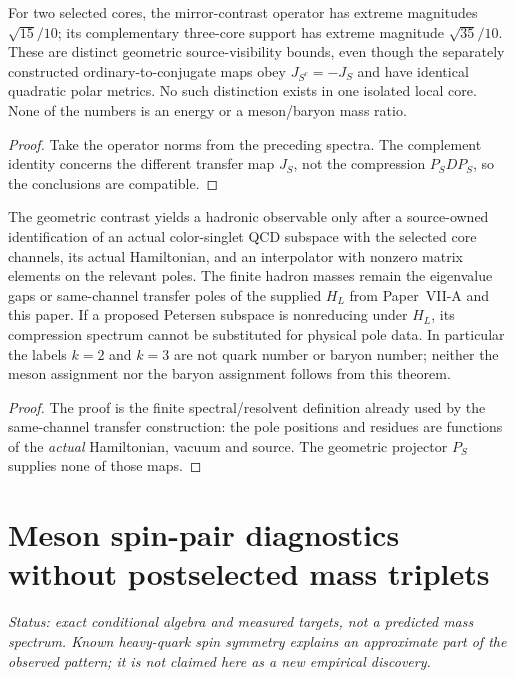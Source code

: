 \documentclass[12pt,a4paper]{article}
\begin{document}
\begin{corollary}
\label{p11:cor:v323-2-3-contrast}
For two selected cores, the mirror-contrast operator has extreme
magnitudes $\sqrt{15}/10$; its complementary three-core support has
extreme magnitude $\sqrt{35}/10$.  These are distinct geometric
source-visibility bounds, even though the separately constructed
ordinary-to-conjugate maps obey
$J_{S^c}=-J_S$ and have identical quadratic polar metrics.
No such distinction exists in one isolated local core.  None of the
numbers is an energy or a meson/baryon mass ratio.
\end{corollary}
\begin{proof}
Take the operator norms from the preceding spectra.  The
complement identity concerns the different transfer map $J_S$,
not the compression $P_SDP_S$, so the conclusions are compatible.
\end{proof}

\begin{proposition}
\label{p11:prop:v323-actual-hadron-spectrum-criterion}
The geometric contrast yields a hadronic observable only after a
source-owned identification of an actual color-singlet QCD subspace
with the selected core channels, its actual Hamiltonian, and an
interpolator with nonzero matrix elements on the relevant poles.
The finite hadron masses remain the eigenvalue gaps or same-channel
transfer poles of the supplied $H_L$ from Paper~VII-A and this paper.
If a proposed Petersen subspace is nonreducing under $H_L$, its
compression spectrum cannot be substituted for physical pole data.
In particular the labels $k=2$ and $k=3$ are not quark number or
baryon number; neither the meson assignment nor the baryon assignment
follows from this theorem.
\end{proposition}
\begin{proof}
The proof is the finite spectral/resolvent definition already used by
the same-channel transfer construction: the pole positions and
residues are functions of the \emph{actual} Hamiltonian, vacuum and
source.  The geometric projector $P_S$ supplies none of those maps.
\end{proof}



\section{Meson spin-pair diagnostics without postselected mass triplets}
\label{p11:sec:v327-meson-mirror-readouts}
\noindent\textit{Status: exact conditional algebra and measured targets,
not a predicted mass spectrum.  Known heavy-quark spin symmetry explains
an approximate part of the observed pattern; it is not claimed here
as a new empirical discovery.}
\end{document}

